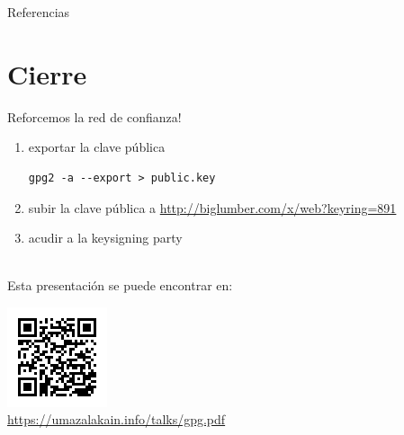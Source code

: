 \documentclass{beamer}
\begin{document}
\begin{frame}[allowframebreaks]{Referencias}
    \nocite{*}
    \printbibliography
\end{frame}


\section{Cierre}
\begin{frame}[fragile]
Reforcemos la red de confianza!
\begin{enumerate}
    \item exportar la clave pública
        \begin{lstlisting}
gpg2 -a --export > public.key
        \end{lstlisting}
    \item subir la clave pública a \url{http://biglumber.com/x/web?keyring=891}
    \item acudir a la keysigning party
\end{enumerate}

\hfill\\

Esta presentación se puede encontrar en:
\begin{center}
    \includegraphics[height=.2\textheight]{qrlink}\\
    \url{https://umazalakain.info/talks/gpg.pdf}
\end{center}
\end{frame}
\end{document}
